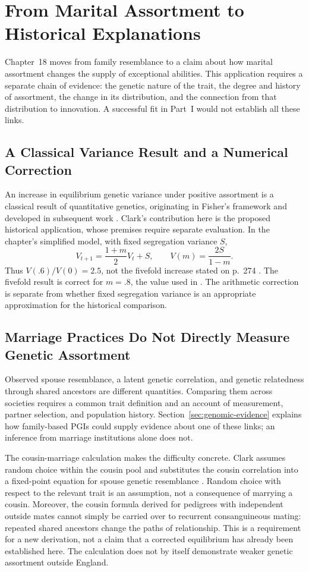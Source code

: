 \section{From Marital Assortment to Historical Explanations}
\label{sec:historical-application}
Chapter~18 moves from family resemblance to a claim about how marital
assortment changes the supply of exceptional abilities. This application
requires a separate chain of evidence: the genetic nature of the trait,
the degree and history of assortment, the change in its distribution,
and the connection from that distribution to innovation. A successful
fit in Part~I would not establish all these links.

\subsection{A Classical Variance Result and a Numerical Correction}
An increase in equilibrium genetic variance under positive assortment is
a classical result of quantitative genetics, originating in Fisher's
framework and developed in subsequent work \citep{Fisher1918,Nagylaki1982}.
Clark's contribution here is the proposed historical application, whose
premises require separate evaluation. In the chapter's simplified model,
with fixed segregation variance $S$,
\[
 V_{t+1}=\frac{1+m}{2}V_t+S,
 \qquad V(m)=\frac{2S}{1-m}.
\]
Thus $V(.6)/V(0)=2.5$, not the fivefold increase stated on p.~274
\citep{Clark2026}. The fivefold result is correct for $m=.8$, the value
used in \citet[pp.~3--4]{ClarkCummins2022}. The arithmetic correction is
separate from whether fixed segregation variance is an appropriate
approximation for the historical comparison.

\subsection{Marriage Practices Do Not Directly Measure Genetic Assortment}
Observed spouse resemblance, a latent genetic correlation, and genetic
relatedness through shared ancestors are different quantities. Comparing
them across societies requires a common trait definition and an account
of measurement, partner selection, and population history. Section~\ref{sec:genomic-evidence}
explains how family-based PGIs could supply evidence about one of these
links; an inference from marriage institutions alone does not.

The cousin-marriage calculation makes the difficulty concrete. Clark
assumes random choice within the cousin pool and substitutes the cousin
correlation into a fixed-point equation for spouse genetic resemblance
\citep[pp.~278--280]{Clark2026}. Random choice with respect to the relevant
trait is an assumption, not a consequence of marrying a cousin. Moreover,
the cousin formula derived for pedigrees with independent outside mates
cannot simply be carried over to recurrent consanguineous mating: repeated
shared ancestors change the paths of relationship. This is a requirement
for a new derivation, not a claim that a corrected equilibrium has already
been established here. The calculation does not by itself demonstrate
weaker genetic assortment outside England.

